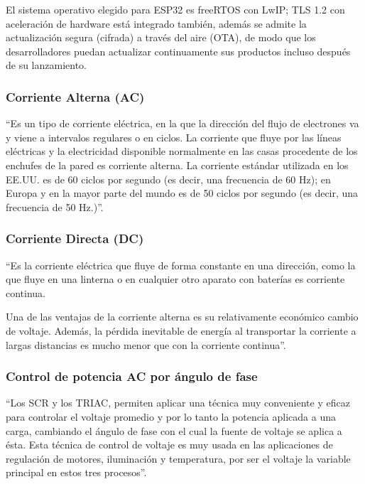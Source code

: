 El sistema operativo elegido para ESP32 es freeRTOS con LwIP; TLS 1.2 con aceleración de hardware está integrado también, además se admite la actualización segura (cifrada) a través del aire (OTA), de modo que los desarrolladores puedan actualizar continuamente sus productos incluso después de su lanzamiento.\cite{EW32}


\subsubsection{Corriente Alterna (AC)}

``Es un tipo de corriente eléctrica, en la que la dirección del flujo de electrones va y viene a intervalos regulares o en ciclos. La corriente que fluye por las líneas eléctricas y la electricidad disponible normalmente en las casas procedente de los enchufes de la pared es corriente alterna. La corriente estándar utilizada en los EE.UU. es de 60 ciclos por segundo (es decir, una frecuencia de 60 Hz); en Europa y en la mayor parte del mundo es de 50 ciclos por segundo (es decir, una frecuencia de 50 Hz.)''. \cite{Cor}

\subsubsection{Corriente Directa (DC)}

``Es la corriente eléctrica que fluye de forma constante en una dirección, como la que fluye en una linterna o en cualquier otro aparato con baterías es corriente continua.

Una de las ventajas de la corriente alterna es su relativamente económico cambio de voltaje. Además, la pérdida inevitable de energía al transportar la corriente a largas distancias es mucho menor que con la corriente continua''. \cite{Cor}

\subsubsection{Control de potencia AC por ángulo de fase}

``Los SCR y los TRIAC, permiten aplicar una técnica muy conveniente y eficaz para controlar el voltaje promedio y por lo tanto la potencia aplicada a una carga, cambiando el ángulo de fase con el cual la fuente de voltaje se aplica a ésta. Esta técnica de control de voltaje es muy usada en las aplicaciones de regulación de motores, iluminación y temperatura, por ser el voltaje la variable principal en estos tres procesos''.\cite{CEKIT}\\

